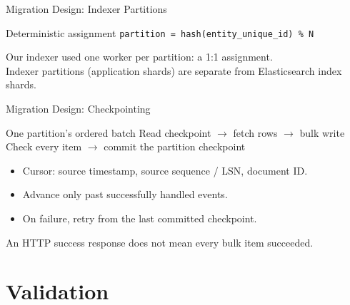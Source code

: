\documentclass[aspectratio=169]{beamer}
\begin{document}
\begin{frame}{Migration Design: Indexer Partitions}
  \centering
  \begin{block}{Deterministic assignment}
    \centering \texttt{partition = hash(entity\_unique\_id) \% N}
  \end{block}
  \vspace{0.2cm}
  \vspace{0.15cm}

  \small Our indexer used one worker per partition: a 1:1 assignment.\\
  Indexer partitions (application shards) are separate from Elasticsearch index shards.
\end{frame}

\begin{frame}{Migration Design: Checkpointing}
  \begin{block}{One partition's ordered batch}
    Read checkpoint $\rightarrow$ fetch rows $\rightarrow$ bulk write\\[0.2cm]
    Check every item $\rightarrow$ commit the partition checkpoint
  \end{block}
  \begin{itemize}
    \item Cursor: source timestamp, source sequence / LSN, document ID.
    \item Advance only past successfully handled events.
    \item On failure, retry from the last committed checkpoint.
  \end{itemize}
  \small An HTTP success response does not mean every bulk item succeeded.
\end{frame}

\section{Validation}
\end{document}
